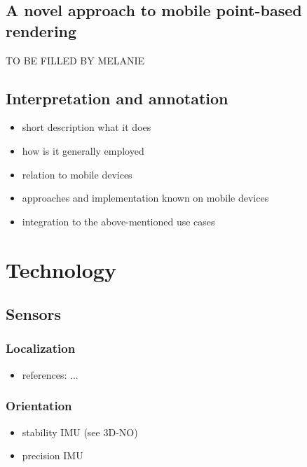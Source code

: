 \documentclass[review]{elsarticle}
\begin{document}
\subsection{A novel approach to mobile point-based rendering}

TO BE FILLED BY MELANIE

\subsection{Interpretation and annotation}

\begin{itemize}
\item short description what it does
\item how is it generally employed
\item relation to mobile devices
\item approaches and implementation known on mobile devices
\item integration to the above-mentioned use cases
\end{itemize}



\section{Technology}
\label{sec:technology}

\subsection{Sensors}

\subsubsection{Localization}

\begin{itemize}
\item references: ...
\end{itemize}

\subsubsection{Orientation}

\begin{itemize}
\item stability IMU (see 3D-NO)
\item precision IMU
\end{itemize}
\end{document}
